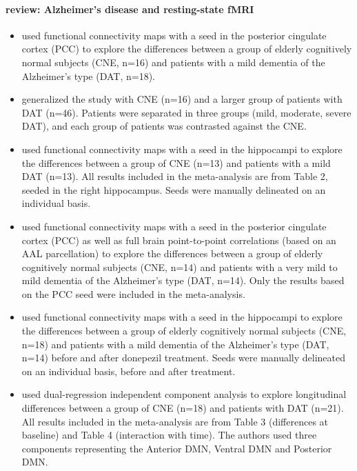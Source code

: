 \paragraph{review: Alzheimer's disease and resting-state fMRI} 
\begin{itemize}
\item \cite{Zhang2009a} used functional connectivity maps with a seed in the posterior cingulate cortex (PCC) to explore the differences between a group of elderly cognitively normal subjects (CNE, n=16) and patients with a mild dementia of the Alzheimer's type (DAT, n=18).
\item \cite{Zhang2010} generalized the \cite{Zhang2009a} study with CNE (n=16) and a larger group of patients with DAT (n=46). Patients were separated in three groups (mild, moderate, severe DAT), and each group of patients was contrasted against the CNE.
\item \cite{Wang2006a} used functional connectivity maps with a seed in the hippocampi to explore the differences between a group of CNE (n=13) and patients with a mild DAT (n=13). All results included in the meta-analysis are from Table 2, seeded in the right hippocampus. Seeds were manually delineated on an individual basis.
\item \cite{Wang2007a} used functional connectivity maps with a seed in the posterior cingulate cortex (PCC) as well as full brain point-to-point correlations (based on an AAL parcellation) to explore the differences between a group of elderly cognitively normal subjects (CNE, n=14) and patients with a very mild to mild dementia of the Alzheimer's type (DAT, n=14). Only the results based on the PCC seed were included in the meta-analysis.
\item \cite{Goveas2011} used functional connectivity maps with a seed in the hippocampi to explore the differences between a group of elderly cognitively normal subjects (CNE, n=18) and patients with a mild dementia of the Alzheimer's type (DAT, n=14) before and after donepezil treatment. Seeds were manually delineated on an individual basis, before and after treatment.
\item \cite{Damoiseaux2012} used dual-regression independent component analysis to explore longitudinal differences between a group of CNE (n=18) and patients with DAT (n=21). All results included in the meta-analysis are from Table 3 (differences at baseline) and Table 4 (interaction with time). The authors used three components representing the Anterior DMN, Ventral DMN and Posterior DMN.
\end{itemize}

